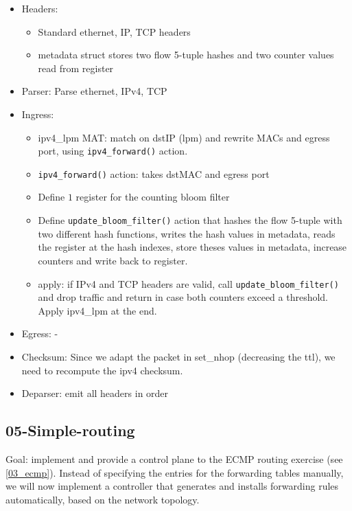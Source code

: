 \documentclass[11pt,oneside,a4paper]{article}
\begin{document}
\vspace{-\topsep}
\begin{itemize}
	\setlength{\itemsep}{0pt}
	\setlength{\parskip}{0pt}
	\item Headers:
	\begin{itemize}
		\setlength{\itemsep}{0pt}
		\setlength{\parskip}{0pt}
		\item Standard ethernet, IP, TCP headers
		\item metadata struct stores two flow 5-tuple hashes and two counter values read from register
	\end{itemize}
	\item Parser: Parse ethernet, IPv4, TCP
	\item Ingress:
	\begin{itemize}
		\setlength{\itemsep}{0pt}
		\setlength{\parskip}{0pt}
		\item ipv4\_lpm MAT: match on dstIP (lpm) and rewrite MACs and egress port, using \texttt{ipv4\_forward()} action.
		\item \texttt{ipv4\_forward()} action: takes dstMAC and egress port
		\item Define $1$ register for the counting bloom filter
		\item Define \texttt{update\_bloom\_filter()} action that hashes the flow 5-tuple with two different hash functions, writes the hash values in metadata, reads the register at the hash indexes, store theses values in metadata, increase counters and write back to register.
		\item apply: if IPv4 and TCP headers are valid, call \texttt{update\_bloom\_filter()} and drop traffic and return in case both counters exceed a threshold. Apply ipv4\_lpm at the end. 
	\end{itemize}
	\item Egress: -
	\item Checksum: Since we adapt the packet in set\_nhop (decreasing the ttl), we need to recompute the ipv4 checksum.
	\item Deparser: emit all headers in order
\end{itemize}
\vspace{-\topsep}

\subsection{05-Simple-routing}
\label{05-simple-routing}

Goal: implement and provide a control plane to the ECMP routing exercise (see \ref{03_ecmp}). Instead of specifying the entries for the forwarding tables manually, we will now implement a controller that generates and installs forwarding rules automatically, based on the network topology.
\end{document}
